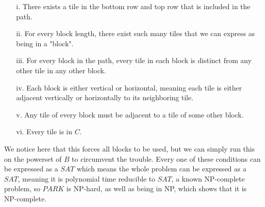 \documentclass{article}
\begin{document}
	\begin{itemize}
		\item[i.] There exists a tile in the bottom row and top row that 
			is included in the path. 
		\item[ii.] For every block length, there exist such many tiles 
			that we can express as being in a "block".
		\item[iii.] For every block in the path, every tile in each block 
			is distinct from any other tile in any other block.
		\item[iv.] Each block is either vertical or horizontal, meaning 
			each tile is either adjacent vertically or horizontally to its 
			neighboring tile.
		\item[v.] Any tile of every block must be adjacent to a tile of 
			some other block.
		\item[vi.] Every tile is in $C$.
	\end{itemize}

	We notice here that this forces all blocks to be used, but we can simply 
	run this on the powerset of $B$ to circumvent the trouble. Every one 
	of these conditions can be expressed as a $SAT$ which means the whole 
	problem can be expressed as a $SAT$, meaning it is polynomial time 
	reducible to $SAT$, a known NP-complete problem, so $PARK$ is 
	NP-hard, as well as being in NP, which shows that it is NP-complete.
\end{document}

